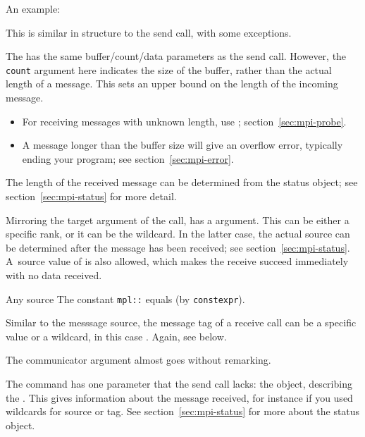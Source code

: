 An example:
%

This is similar in structure to the send call, with some exceptions.

The  has the same buffer/count/data parameters as the send
call.
However, 
the \lstinline{count} argument here indicates the size of the buffer,
rather than the actual length of a message.
This sets an upper bound on the length of the incoming message.
\begin{itemize}
\item For receiving messages with unknown length, use ;
  section~\ref{sec:mpi-probe}.
\item A message longer than the buffer size will give an overflow error,
  typically ending your program; see section~\ref{sec:mpi-error}.
\end{itemize}
The length of the received message can be determined 
from the status object; see section~\ref{sec:mpi-status} for more detail.

Mirroring the target argument of the  call,
 has a 
argument.
This can be either a specific rank, or it can be the
 wildcard. In the latter case, the actual
source can be determined after the message has been received;
see section~\ref{sec:mpi-status}.
A~source value of  is also allowed,
which makes the receive succeed immediately with no data received.

\begin{mplnote}{Any source}
  The constant \lstinline+mpl::+
  equals  (by \lstinline+constexpr+).
\end{mplnote}

Similar to the messsage source, the message tag of a receive call can
be a specific value or a wildcard, in this case
.
Again, see below.

The communicator argument almost goes without remarking.

The  command has one parameter that
the send call lacks: the  object,
describing the .
This gives information about the message received,
for instance if you used wildcards for source or tag.
See section~\ref{sec:mpi-status}
for more about the status object.

